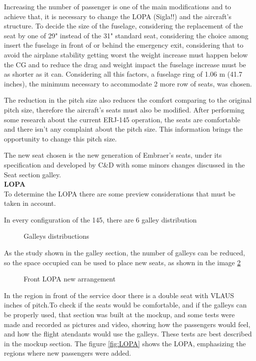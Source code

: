 ﻿%
Increasing the number of passenger is one of the main modifications and to achieve that, it is necessary to change the LOPA (Sigla!!) and the aircraft's structure. To decide the size of the fuselage, considering the replacement of the seat by one of 29" instead of the 31" standard seat, considering the choice among insert the fuselage in front of or behind the emergency exit, considering that to avoid the airplane stability getting worst the weight increase must happen below the CG and to reduce the drag and weight impact the fuselage increase must be as shorter as it can. Considering all this factors, a fuselage ring of 1.06 m (41.7 inches), the minimum necessary to accommodate 2 more row of seats, was chosen.


The reduction in the pitch size also reduces the comfort comparing to the original pitch size, therefore the aircraft's seats must also be modified. After performing some research about the current ERJ-145 operation, the seats are comfortable and there isn't any complaint about the pitch size. This information brings the opportunity to change this pitch size.

The new seat chosen is the new generation of Embraer's seats, under its specification and developed by C\&D with some minors changes discussed in the Seat section galley.\\

\textbf{LOPA}
\\

To determine the LOPA there are some preview considerations that must be taken in account.

In every configuration of the 145, there are 6 galley distribution
\begin{figure}[H] %
\caption{Galleys distribuctions}
\label{fig:galleysdistribuction}
\end{figure}

As the study shown in the galley section, the number of galleys can be reduced, so the space occupied can be used to place new seats, as shown in the image \ref{fig:frontlopa}


\begin{figure}[H] %
\caption{Front LOPA new arrangement}
\label{fig:frontlopa}
\end{figure}

In the region in front of the service door there is a double seat with VLAUS inches of pitch.To check if the seats would be comfortable, and if the galleys can be properly used, that section was built at the mockup, and some tests were made and recorded as pictures and video, showing how the passengers would feel, and how the flight atendants would use the galleys. These tests are best described in the mockup section.
The figure \ref{fig:LOPA} shows the LOPA, emphasizing the regions where new passengers were added.

